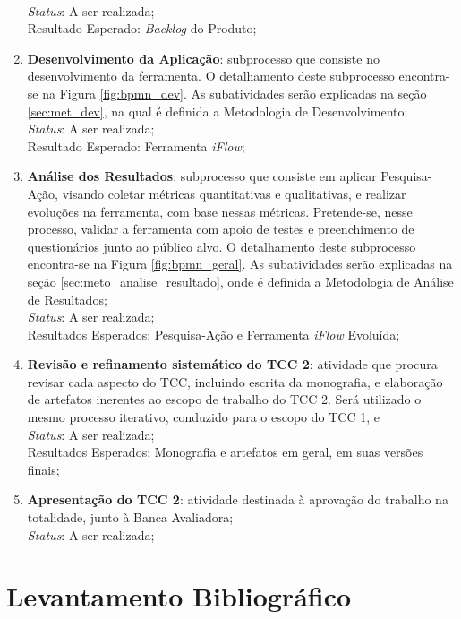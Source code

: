 \begin{enumerate}
    \\
    \textit{Status}: A ser realizada;
    \\
    Resultado Esperado: \textit{Backlog} do Produto;
    \item \textbf{Desenvolvimento da Aplicação}: subprocesso que consiste no desenvolvimento da ferramenta. O detalhamento deste subprocesso encontra-se na Figura \ref{fig:bpmn_dev}. As subatividades serão explicadas na seção \ref{sec:met_dev}, na qual é definida a Metodologia de Desenvolvimento;
    \\
    \textit{Status}: A ser realizada;
    \\
    Resultado Esperado: Ferramenta \textit{iFlow};
    \item \textbf{Análise dos Resultados}: subprocesso que consiste em aplicar Pesquisa-Ação, visando coletar métricas quantitativas e qualitativas, e realizar evoluções na ferramenta, com base nessas métricas. Pretende-se, nesse processo, validar a ferramenta com apoio de testes e preenchimento de questionários junto ao público alvo. O detalhamento deste subprocesso encontra-se na Figura \ref{fig:bpmn_geral}. As subatividades serão explicadas na seção \ref{sec:meto_analise_resultado}, onde é definida a Metodologia de Análise de Resultados;
    \\
    \textit{Status}: A ser realizada;
    \\
    Resultados Esperados: Pesquisa-Ação e Ferramenta \textit{iFlow} Evoluída;
    \item \textbf{Revisão e refinamento sistemático do TCC 2}: atividade que procura revisar cada aspecto do TCC, incluindo escrita da monografia, e elaboração de artefatos inerentes ao escopo de trabalho do TCC 2. Será utilizado o mesmo processo iterativo, conduzido para o escopo do TCC 1, e
    \\
    \textit{Status}: A ser realizada;
    \\
    Resultados Esperados: Monografia e artefatos em geral, em suas versões finais;
    \item \textbf{Apresentação do TCC 2}: atividade destinada à aprovação do trabalho na totalidade, junto à Banca Avaliadora;
    \\
    \textit{Status}: A ser realizada;
\end{enumerate}

\section{Levantamento Bibliográfico}

